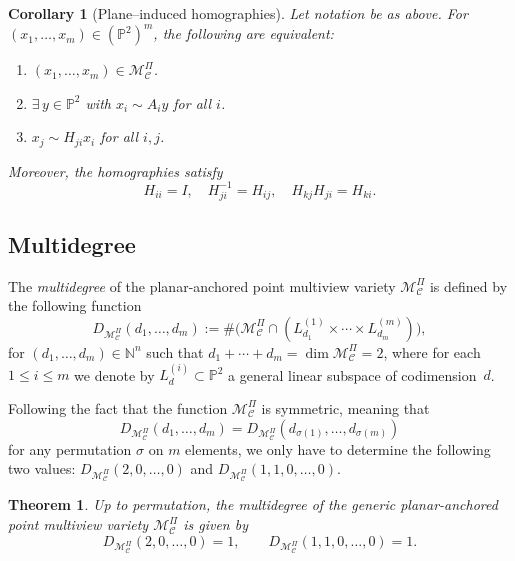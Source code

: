 \documentclass{article}
\newtheorem{theorem}{Theorem}
\newtheorem{corollary}{Corollary}
\newcommand{\PP}{\mathbb{P}}
\begin{document}
\begin{corollary}[Plane–induced homographies]
Let notation be as above. For $(x_1,\dots,x_m)\in(\PP^2)^m$, the following are equivalent:
\begin{enumerate}
\item $(x_1,\dots,x_m)\in\mathcal{M}_\mathcal{C}^\Pi$.
\item $\exists\,y\in\PP^2$ with $x_i\sim A_i y$ for all $i$.
\item $x_j\sim H_{j i}x_i$ for all $i,j$.
\end{enumerate}
Moreover, the homographies satisfy
\[
H_{i i}=I,\quad
H_{j i}^{-1}=H_{i j},\quad
H_{k j}H_{j i}=H_{k i}.
\]
\end{corollary}

\subsection*{Multidegree}
The \emph{multidegree} of the planar-anchored point multiview variety $\mathcal{M}^\Pi_{\mathcal{C}}$ is defined by the following function
\[
D_{\mathcal{M}^\Pi_{\mathcal{C}}}(d_1,\ldots,d_m) := 
\#\bigl(\mathcal{M}^\Pi_{\mathcal{C}} \cap (L^{(1)}_{d_1}\times \cdots \times L^{(m)}_{d_m})\bigr),
\]
for $(d_1,\ldots,d_m)\in\mathbb{N}^n$ such that $d_1+\cdots+d_m = \dim \mathcal{M}^\Pi_{\mathcal{C}}=2$, 
where for each~$1\le i\le m$ we denote by $L^{(i)}_d \subset \mathbb{P}^2$ a general linear subspace of codimension~$d$.

Following the fact that the function $\mathcal{M}^\Pi_{\mathcal{C}}$ is symmetric, meaning that 
\[
D_{\mathcal{M}^\Pi_{\mathcal{C}}}(d_1,\ldots,d_m) = 
D_{\mathcal{M}^\Pi_{\mathcal{C}}}(d_{\sigma(1)},\ldots,d_{\sigma(m)})
\]
for any permutation $\sigma$ on $m$ elements, we only have to determine the following two values:
$D_{\mathcal{M}^\Pi_{\mathcal{C}}}(2,0,\ldots,0)$ and 
$D_{\mathcal{M}^\Pi_{\mathcal{C}}}(1,1,0,\ldots,0)$.

\begin{theorem}
Up to permutation, the multidegree of the generic planar-anchored point multiview variety $\mathcal{M}^\Pi_{\mathcal{C}}$ is given by
\[
D_{\mathcal{M}^\Pi_{\mathcal{C}}}(2,0,\ldots,0)=1, 
\qquad 
D_{\mathcal{M}^\Pi_{\mathcal{C}}}(1,1,0,\ldots,0)=1.
\]
\end{theorem}
\end{document}

